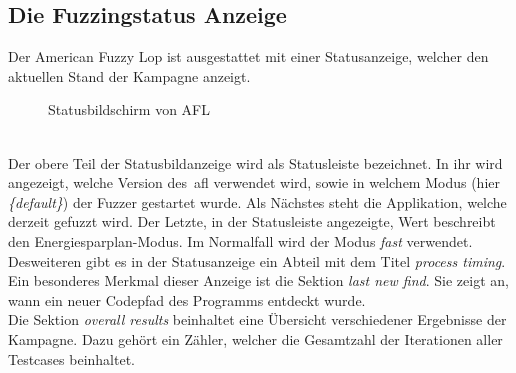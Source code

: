 
\subsection{Die Fuzzingstatus Anzeige}\label{subsec:der-fuzzingstatus-bildschirm}
Der American Fuzzy Lop ist ausgestattet mit einer Statusanzeige, welcher den aktuellen Stand der Kampagne anzeigt.\\
\linebreak
\begin{figure}[h]
    \caption{Statusbildschirm von AFL}\label{fig:fuzzing-status}
\end{figure}\\
Der obere Teil der Statusbildanzeige wird als Statusleiste bezeichnet.
In ihr wird angezeigt, welche Version des~\gls{afl} verwendet wird, sowie in welchem Modus (hier \textit{\{default\}})
der Fuzzer gestartet wurde.
Als Nächstes steht die Applikation, welche derzeit gefuzzt wird.
Der Letzte, in der Statusleiste angezeigte, Wert beschreibt den Energiesparplan-Modus.
Im Normalfall wird der Modus \textit{fast} verwendet. \\
\linebreak
Desweiteren gibt es in der Statusanzeige ein Abteil mit dem Titel \textit{process timing}.
Ein besonderes Merkmal dieser Anzeige ist die Sektion \textit{last new find}.
Sie zeigt an, wann ein neuer Codepfad des Programms entdeckt wurde. \\
\linebreak
Die Sektion \textit{overall results} beinhaltet eine Übersicht verschiedener Ergebnisse der Kampagne.
Dazu gehört ein Zähler, welcher die Gesamtzahl der Iterationen aller Testcases beinhaltet.
